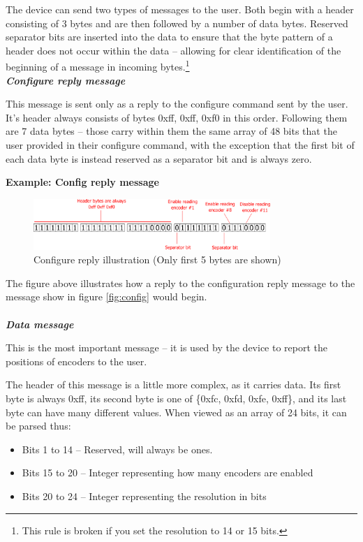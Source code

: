 \documentclass[twoside]{article}
\begin{document}
The device can send two types of messages to the user. Both begin with a header consisting of 3 bytes and are then followed by a number of data bytes. Reserved separator bits are inserted into the data to ensure that the byte pattern of a header does not occur within the data -- allowing for clear identification of the beginning of a message in incoming bytes.\footnote{This rule is broken if you set the resolution to 14 or 15 bits.} \\

\noindent\emph{\textbf{Configure reply message}}

This message is sent only as a reply to the configure command sent by the user. It's header always consists of bytes 0xff, 0xff, 0xf0 in this order. Following them are 7 data bytes -- those carry within them the same array of 48 bits that the user provided in their configure command, with the exception that the first bit of each data byte is instead reserved as a separator bit and is always zero.

\textbf{Example: Config reply message}
\begin{figure}[h!]
	\centering
	\includegraphics[width=0.8\textwidth]{figs/reply1}
	\caption{Configure reply illustration (Only first 5 bytes are shown)}
	\label{fig:JpgEpsCompare}
\end{figure}

The figure above illustrates how a reply to the configuration reply message to the message show in figure \ref{fig:config} would begin. \\\\

\noindent{}\emph{\textbf{Data message}}

This is the most important message -- it is used by the device to report the positions of encoders to the user.

The header of this message is a little more complex, as it carries data. Its first byte is always 0xff, its second byte is one of \{0xfc, 0xfd, 0xfe, 0xff\}, and its last byte can have many different values. When viewed as an array of 24 bits, it can be parsed thus:

\begin{itemize}
\item Bits 1 to 14 -- Reserved, will always be ones.
\item Bits 15 to 20 -- Integer representing how many encoders are enabled
\item Bits 20 to 24 -- Integer representing the resolution in bits
\end{itemize}
\end{document}
